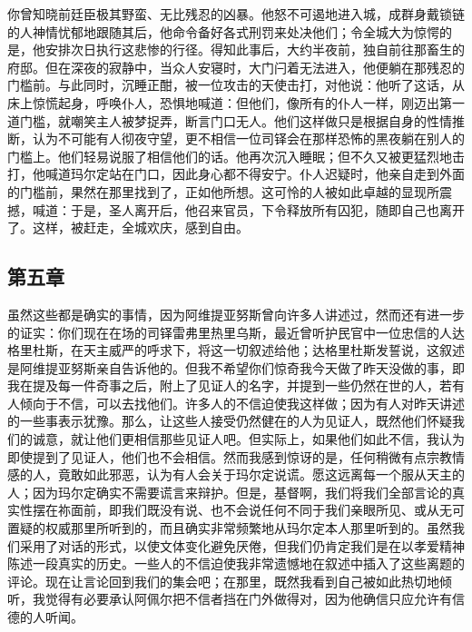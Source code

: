 你曾知晓前廷臣极其野蛮、无比残忍的凶暴。他怒不可遏地进入城，成群身戴锁链的人神情忧郁地跟随其后，他命令备好各式刑罚来处决他们；令全城大为惊愕的是，他安排次日执行这悲惨的行径。得知此事后，大约半夜前，独自前往那畜生的府邸。但在深夜的寂静中，当众人安寝时，大门闩着无法进入，他便躺在那残忍的门槛前。与此同时，沉睡正酣，被一位攻击的天使击打，对他说：他听了这话，从床上惊慌起身，呼唤仆人，恐惧地喊道：但他们，像所有的仆人一样，刚迈出第一道门槛，就嘲笑主人被梦捉弄，断言门口无人。他们这样做只是根据自身的性情推断，认为不可能有人彻夜守望，更不相信一位司铎会在那样恐怖的黑夜躺在别人的门槛上。他们轻易说服了相信他们的话。他再次沉入睡眠；但不久又被更猛烈地击打，他喊道玛尔定站在门口，因此身心都不得安宁。仆人迟疑时，他亲自走到外面的门槛前，果然在那里找到了，正如他所想。这可怜的人被如此卓越的显现所震撼，喊道：于是，圣人离开后，他召来官员，下令释放所有囚犯，随即自己也离开了。这样，被赶走，全城欢庆，感到自由。\par


\subsection{第五章}

虽然这些都是确实的事情，因为阿维提亚努斯曾向许多人讲述过，然而还有进一步的证实：你们现在在场的司铎雷弗里热里乌斯，最近曾听护民官中一位忠信的人达格里杜斯，在天主威严的呼求下，将这一切叙述给他；达格里杜斯发誓说，这叙述是阿维提亚努斯亲自告诉他的。但我不希望你们惊奇我今天做了昨天没做的事，即我在提及每一件奇事之后，附上了见证人的名字，并提到一些仍然在世的人，若有人倾向于不信，可以去找他们。许多人的不信迫使我这样做；因为有人对昨天讲述的一些事表示犹豫。那么，让这些人接受仍然健在的人为见证人，既然他们怀疑我们的诚意，就让他们更相信那些见证人吧。但实际上，如果他们如此不信，我认为即使提到了见证人，他们也不会相信。然而我感到惊讶的是，任何稍微有点宗教情感的人，竟敢如此邪恶，认为有人会关于玛尔定说谎。愿这远离每一个服从天主的人；因为玛尔定确实不需要谎言来辩护。但是，基督啊，我们将我们全部言论的真实性摆在祢面前，即我们既没有说、也不会说任何不同于我们亲眼所见、或从无可置疑的权威那里所听到的，而且确实非常频繁地从玛尔定本人那里听到的。虽然我们采用了对话的形式，以使文体变化避免厌倦，但我们仍肯定我们是在以孝爱精神陈述一段真实的历史。一些人的不信迫使我非常遗憾地在叙述中插入了这些离题的评论。现在让言论回到我们的集会吧；在那里，既然我看到自己被如此热切地倾听，我觉得有必要承认阿佩尔把不信者挡在门外做得对，因为他确信只应允许有信德的人听闻。\par

